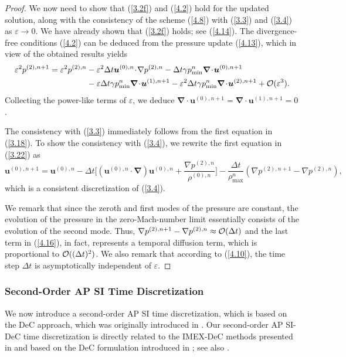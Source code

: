 \documentclass[preprint,12pt]{elsarticle}
\def\bnabla{\bm{\nabla}}
\newcommand{\dt}{\Delta t}
\newcommand{\ve}{\varepsilon}
\newcommand\eref[1]{(\ref{#1})}
\begin{document}
\begin{proof}
	We now need to show that \eref{3.2f} and \eref{4.2} hold for the updated solution, along with the consistency of the scheme \eref{4.8} with
	\eref{3.3} and \eref{3.4} as $\ve\to0$. We have already shown that \eref{3.2f} holds; see \eref{4.14}. The divergence-free conditions
	\eref{4.2} can be deduced from the pressure update \eref{4.13}, which in view of the obtained results yields
	$$
	\begin{aligned}
		\ve^2p^{(2),n+1}=\ve^2p^{(2),n}&-\ve^2\dt\bm u^{(0),n}\!\cdot\!\nabla p^{(2),n}-\dt\gamma p_{\min}^n\bnabla\!\cdot\!\bm u^{(0),n+1}\\
		&-\ve\dt\gamma p_{\min}^n\bnabla\!\cdot\!\bm u^{(1),n+1}-\ve^2\dt\gamma p_{\min}^n\bnabla\!\cdot\!\bm u^{(2),n+1}+{\cal O}(\ve^3).
	\end{aligned}
	$$
	Collecting the power-like terms of $\ve$, we deduce $\bnabla\!\cdot\!\bm u^{(0),n+1}=\bnabla\!\cdot\!\bm u^{(1),n+1}=0$.
	
	The consistency with \eref{3.3} immediately follows from the first equation in \eref{3.18}. To show the consistency with \eref{3.4}, we
	rewrite the first equation in \eref{3.22} as
	\begin{equation}
		\bm u^{(0),n+1}=\bm u^{(0),n}-\dt\bigg[(\bm u^{(0),n}\!\cdot\!\bnabla)\bm u^{(0),n}+\frac{\nabla p^{(2),n}}{\rho^{(0),n}}\bigg]
		-\frac{\dt}{\rho_{\max}^n}\left(\nabla p^{(2),n+1}-\nabla p^{(2),n}\right),
		\label{4.16}
	\end{equation}
	which is a consistent discretization of \eref{3.4}.
	
	We remark that since the zeroth and first modes of the pressure are constant, the evolution of the pressure in the zero-Mach-number limit
	essentially consists of the evolution of the second mode. Thus, $\nabla p^{(2),n+1}-\nabla p^{(2),n}\approx{\cal O}(\dt)$ and the last term
	in \eref{4.16}, in fact, represents a temporal diffusion term, which is proportional to ${\cal O}((\dt)^2)$. We also remark that according
	to \eref{4.10}, the time step $\dt$ is asymptotically independent of $\ve$.%
\end{proof}

\subsubsection{Second-Order AP SI Time Discretization}\label{sec313}
We now introduce a second-order AP SI time discretization, which is based on the DeC approach, which was originally introduced in
\cite{fox1949some}. Our second-order AP SI-DeC time discretization is directly related to the IMEX-DeC methods presented in
\cite{offner2025analysis} and based on the DeC formulation introduced in \cite{Decremi}; see also
\cite{micalizzi2025efficient,micalizzi2024new}.
\end{document}
